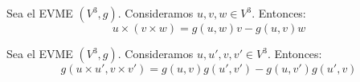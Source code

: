 \begin{prop}
    Sea el EVME $(V^3, g)$. Consideramos $u,v,w\in V^3$. Entonces:
    \begin{equation*}
        u\times (v \times w) = g(u,w) v - g(u,v) w
    \end{equation*}
\end{prop}
\begin{comment}
\begin{proof}
    Realizamos la siguiente distinción de casos:
    \begin{itemize}
        \item \underline{Si $v,w$ linealmente dependientes}:

        Tenemos que $w=kv,\quad k\in \bb{R}$. Entonces:
        \begin{equation*}
            0= u\times (v \times kv) = kg(u,v) v - g(u,v) kv = 0 \Longleftrightarrow 0=0 \quad\text{cierto trivialmente.}
        \end{equation*}

        \item \underline{Si $v,w$ linealmente independientes}:

        Sea $\cc{B}_o=\{e_1, e_2, e_3\}$ base ortonormal positiva, y veamos que se cumple para dicha base:
        \begin{equation*}
            e_1\times (e_2 \times e_3) = e_1\times e_1 = 0 = 0\cdot e_2 - 0\cdot e_3
        \end{equation*}
        
        Tomamos como base $\cc{B}'=\{v,w,u\}$ definida positiva (esto no es restrictivo, ya que en caso contrario se cambian de orden).
    \end{itemize}
\end{proof}
\end{comment}



\begin{prop}
    Sea el EVME $(V^3,g)$. Consideramos $u,u',v,v'\in V^3$. Entonces:
    \begin{equation*}
        g( u\times u',v\times v') = g( u,v)g( u', v') -g( u,v')g( u', v)
    \end{equation*}
\end{prop}

